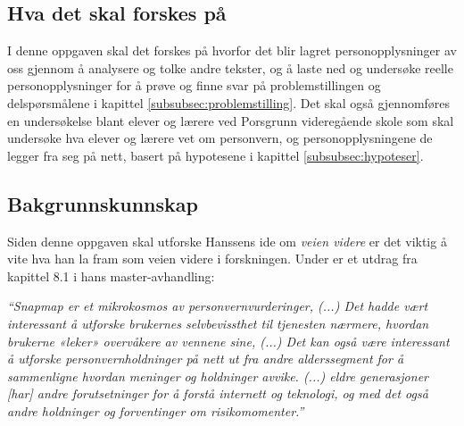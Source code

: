 \subsection{Hva det skal forskes på}
I denne oppgaven skal det forskes på hvorfor det blir lagret personopplysninger av oss gjennom å analysere og tolke andre tekster, og å laste ned og undersøke reelle personopplysninger for å prøve og finne svar på problemstillingen og delspørsmålene i kapittel \ref{subsubsec:problemstilling}. Det skal også gjennomføres en undersøkelse blant elever og lærere ved Porsgrunn videregående skole som skal undersøke hva elever og lærere vet om personvern, og personopplysningene de legger fra seg på nett, basert på hypotesene i kapittel \ref{subsubsec:hypoteser}.

\subsection{Bakgrunnskunnskap}
Siden denne oppgaven skal utforske Hanssens ide om \textit{veien videre} er det viktig å vite hva han la fram som veien videre i forskningen. Under er et utdrag fra kapittel 8.1 i hans master-avhandling:

\textit{``Snapmap er et mikrokosmos av personvernvurderinger, (...) Det hadde vært interessant å utforske brukernes selvbevissthet til tjenesten nærmere, hvordan brukerne «leker» overvåkere av vennene sine, (...) Det kan også være interessant å utforske personvernholdninger på nett ut fra andre alderssegment for å sammenligne hvordan meninger og holdninger avvike. (...) eldre generasjoner [har] andre forutsetninger for å forstå internett og teknologi, og med det også andre holdninger og forventinger om risikomomenter.''} \parencite[69]{master:hanssen}

\newpage